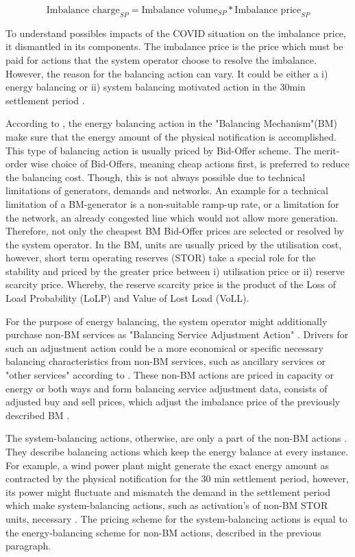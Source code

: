 \documentclass[energies,article,submit,moreauthors,pdftex]{Definitions/mdpi}
\begin{document}
\[ \text{Imbalance charge}_{SP} = \text{Imbalance volume}_{SP} * \text{Imbalance price}_{SP} \]

To understand possibles impacts of the COVID situation on the imbalance price, it dismantled in its components. The imbalance price is the price which must be paid for actions that the system operator choose to resolve the imbalance. However, the reason for the balancing action can vary. It could be either a i) energy balancing or ii) system balancing motivated action in the 30min settlement period \cite{ELEXON2019GuidanceBritain}. 

According to \cite{ELEXON2019GuidanceBritain}, the energy balancing action in the "Balancing Mechanism"(BM) make sure that the energy amount of the physical notification is accomplished. This type of balancing action is usually priced by Bid-Offer scheme. The merit-order wise choice of Bid-Offers, meaning cheap actions first, is preferred to reduce the balancing cost. Though, this is not always possible due to technical limitations of generators, demands and networks. An example for a technical limitation of a BM-generator is a non-suitable ramp-up rate, or a limitation for the network, an already congested line which would not allow more generation. Therefore, not only the cheapest BM Bid-Offer prices are selected or resolved by the system operator. In the BM, units are usually priced by the utilisation cost, however, short term operating reserves (STOR) take a special role for the stability and priced by the greater price between i) utilisation price or ii) reserve scarcity price. Whereby, the reserve scarcity price is the product of the Loss of Load Probability (LoLP) and Value of Lost Load (VoLL). 

For the purpose of energy balancing, the system operator might additionally purchase non-BM services as "Balancing Service Adjustment Action" \cite{Nationalgrid2017ProcurementSO}. Drivers for such an adjustment action could be a more economical or specific necessary balancing characteristics from non-BM services, such as ancillary services or "other services" according to \cite{Nationalgrid2018BalancingStatement}. These non-BM actions are priced in capacity or energy or both ways and form balancing service adjustment data, consists of adjusted buy and sell prices, which adjust the imbalance price of the previously described BM \cite{Nationalgrid2017ProcurementSO,Nationalgrid2018BalancingStatement}.

The system-balancing actions, otherwise, are only a part of the non-BM actions \cite{Nationalgrid2018BalancingStatement}. They describe balancing actions which keep the energy balance at every instance. For example, a wind power plant might generate the exact energy amount as contracted by the physical notification for the 30 min settlement period, however, its power might fluctuate and mismatch the demand in the settlement period which make system-balancing actions, such as activation's of non-BM STOR units, necessary \cite{Nationalgrid2018BalancingStatement}. The pricing scheme for the system-balancing actions is equal to the energy-balancing scheme for non-BM actions, described in the previous paragraph.  
\end{document}
